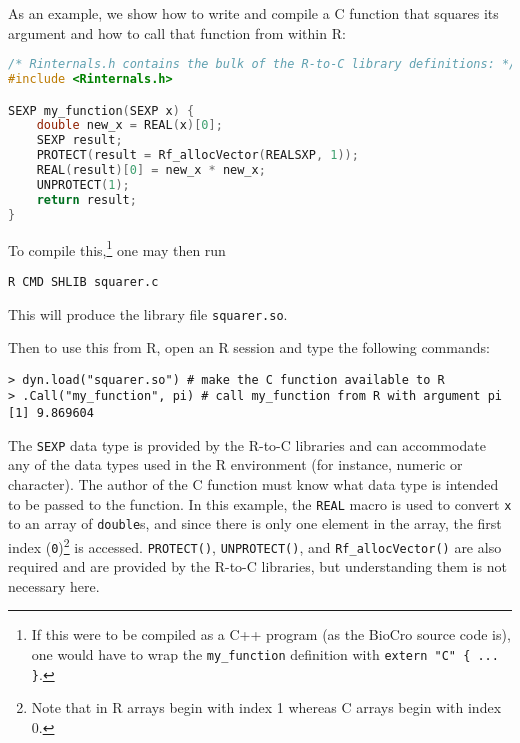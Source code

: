 \documentclass{article}
\newcommand{\code}[1]{\texttt{#1}}
\begin{document}
As an example, we show how to write and compile a C function that
squares its argument and how to call that function from within R:

\begin{center}
\begin{lstlisting}[language=c,title=Contents of file \code{squarer.c}]
/* Rinternals.h contains the bulk of the R-to-C library definitions: */
#include <Rinternals.h>

SEXP my_function(SEXP x) {
    double new_x = REAL(x)[0];
    SEXP result;
    PROTECT(result = Rf_allocVector(REALSXP, 1));
    REAL(result)[0] = new_x * new_x;
    UNPROTECT(1);
    return result;
}
\end{lstlisting}
\end{center}

To compile this,\footnote{If this were to be compiled as a C++ program
  (as the BioCro source code is), one would have to wrap the
  \code{my\_function} definition with \code{extern "C" \{ ... \}}.}
one may then run
\begin{center}
\begin{lstlisting}
R CMD SHLIB squarer.c
\end{lstlisting}
\end{center}
This will produce the library file \code{squarer.so}.

Then to use this from R, open an R session and type the following commands:
\begin{center}
\begin{lstlisting}
> dyn.load("squarer.so") # make the C function available to R
> .Call("my_function", pi) # call my_function from R with argument pi
[1] 9.869604
\end{lstlisting}
\end{center}

The \code{SEXP} data type is provided by the R-to-C libraries and can
accommodate any of the data types used in the R environment (for
instance, numeric or character). The author of the C function must
know what data type is intended to be passed to the function. In this
example, the \code{REAL} macro is used to convert \code{x} to an array
of \code{double}s, and since there is only one element in the array,
the first index (\code{0})\footnote{Note that in R arrays begin with
  index 1 whereas C arrays begin with index 0.} is
accessed. \code{PROTECT()}, \code{UNPROTECT()}, and
\code{Rf\_allocVector()} are also required and are provided by the
R-to-C libraries, but understanding them is not necessary here.
\end{document}
